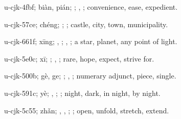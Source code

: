 \begin{multicols}{2}
{\cjkgGlue{}u-cjk-4fbf; biàn, pián; \cjkgGlue{}\cjkgGlue{}\cjkgGlue{}; \cjkgGlue{}, \cjkgGlue{}; convenience, ease, expedient.

\cjkgGlue{}u-cjk-57ce; chéng; \cjkgGlue{}; \cjkgGlue{}; castle, city, town, municipality.

\cjkgGlue{}u-cjk-661f; xīng; \cjkgGlue{}, \cjkgGlue{}; \cjkgGlue{}, \cjkgGlue{}; a star, planet, any point of light.

\cjkgGlue{}u-cjk-5e0c; xī; \cjkgGlue{}; \cjkgGlue{}, \cjkgGlue{}; rare, hope, expect, strive for.

\cjkgGlue{}u-cjk-500b; gè, ge; \cjkgGlue{}; \cjkgGlue{}, \cjkgGlue{}; numerary adjunct, piece, single.

\cjkgGlue{}u-cjk-591c; yè; \cjkgGlue{}, \cjkgGlue{}; \cjkgGlue{}; night, dark, in night, by night.

\cjkgGlue{}u-cjk-5c55; zhǎn; \cjkgGlue{}, \cjkgGlue{}, \cjkgGlue{}; \cjkgGlue{}; open, unfold, stretch, extend.

}
\end{multicols}
